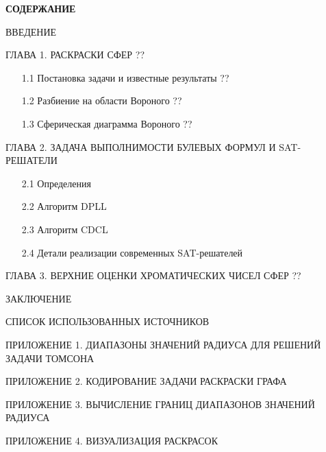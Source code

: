 
\newpage

\thispagestyle{empty} %

\begin{center}
\textbf{СОДЕРЖАНИЕ}
\end{center}
\vspace{1.5mm}

\begin{description}

\item{ВВЕДЕНИЕ} \dotfill \pageref{chapters:introduction}

\item{ГЛАВА 1.} РАСКРАСКИ СФЕР \dotfill ??
\begin{enumerate}
\item[1.1] Постановка задачи  и известные результаты \dotfill ??
\item[1.2] Разбиение на области Вороного \dotfill ??
\item[1.3] Сферическая диаграмма Вороного \dotfill ??
\end{enumerate}

\item{ГЛАВА 2.} ЗАДАЧА ВЫПОЛНИМОСТИ БУЛЕВЫХ ФОРМУЛ И SAT-РЕШАТЕЛИ \dotfill \pageref{chapters:2}
\begin{enumerate}
\item[2.1] Определения \dotfill \pageref{chapters:2.1}
\item[2.2] Алгоритм DPLL \dotfill \pageref{chapters:2.2}
\item[2.3] Алгоритм CDCL \dotfill \pageref{chapters:2.3}
\item[2.4] Детали реализации современных SAT-решателей \dotfill \pageref{chapters:2.4}
\end{enumerate}


\item{ГЛАВА 3.} ВЕРХНИЕ ОЦЕНКИ ХРОМАТИЧЕСКИХ ЧИСЕЛ СФЕР 
\dotfill ??


\item{ЗАКЛЮЧЕНИЕ} \dotfill \pageref{chapters:conclusions}
\item{СПИСОК ИСПОЛЬЗОВАННЫХ ИСТОЧНИКОВ} \dotfill \pageref{chapters:biblio}

\item{ПРИЛОЖЕНИЕ 1. ДИАПАЗОНЫ ЗНАЧЕНИЙ РАДИУСА ДЛЯ РЕШЕНИЙ ЗАДАЧИ ТОМСОНА} \dotfill \pageref{attachments:1}
\item{ПРИЛОЖЕНИЕ 2. КОДИРОВАНИЕ ЗАДАЧИ РАСКРАСКИ ГРАФА} \dotfill \pageref{attachments:2}
\item{ПРИЛОЖЕНИЕ 3. ВЫЧИСЛЕНИЕ ГРАНИЦ ДИАПАЗОНОВ ЗНАЧЕНИЙ РАДИУСА} \dotfill \pageref{attachments:3}
\item{ПРИЛОЖЕНИЕ 4. ВИЗУАЛИЗАЦИЯ РАСКРАСОК} \dotfill \pageref{attachments:4}


\end{description}
